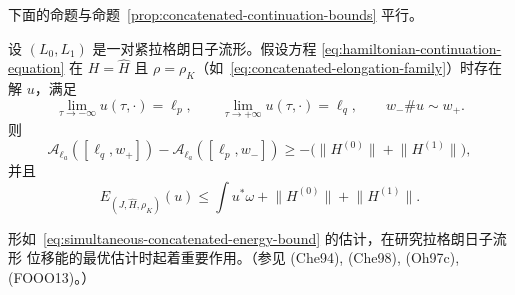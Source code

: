 下面的命题与命题~\ref{prop:concatenated-continuation-bounds} 平行。

\begin{proposition}
\label{prop:simultaneous-concatenated-bounds}
设 $(L_0,L_1)$ 是一对紧拉格朗日子流形。假设方程
\eqref{eq:hamiltonian-continuation-equation} 在 $H=\widehat H$ 且
$\rho=\rho_K$（如~\eqref{eq:concatenated-elongation-family}）时存在解 $u$，满足
\[
  \lim_{\tau\to-\infty}u(\tau,\mathord\cdot)
  =
  \ell_p,
  \qquad
  \lim_{\tau\to+\infty}u(\tau,\mathord\cdot)
  =
  \ell_q,
  \qquad
  w_-\#u\sim w_+.
\]
则
\begin{equation}
  \mathcal A_{\ell_a}([\ell_q,w_+])
  -
  \mathcal A_{\ell_a}([\ell_p,w_-])
  \geq
  -\bigl(
    \lVert H^{(0)}\rVert+\lVert H^{(1)}\rVert
  \bigr),
\label{eq:simultaneous-concatenated-level-bound}
\end{equation}
并且
\begin{equation}
  E_{(J,\widehat H,\rho_K)}(u)
  \leq
  \int u^*\omega
  +
  \lVert H^{(0)}\rVert
  +
  \lVert H^{(1)}\rVert.
\label{eq:simultaneous-concatenated-energy-bound}
\end{equation}
\end{proposition}

\begin{remark}
\label{rem:displacement-energy-role}
形如~\eqref{eq:simultaneous-concatenated-energy-bound} 的估计，在研究拉格朗日子流形
位移能的最优估计时起着重要作用。（参见 (Che94), (Che98), (Oh97c),
(FOOO13)。）
\end{remark}
